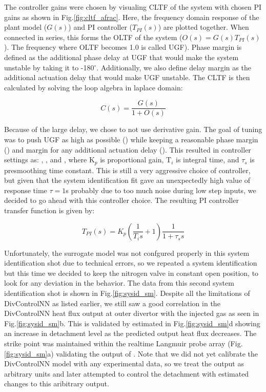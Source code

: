 The controller gains were chosen by visualing \ac{CLTF} of the system with chosen PI gains as shown in Fig.\ref{fig:cltf_afrac}.
Here, the frequency domain response of the plant model ($G(s)$) and PI controller ($T_{PI}(s)$) are plotted together.
When connected in series, this forms the \ac{OLTF} of the system ($O(s) = G(s) T_{PI}(s)$).
The frequency where \ac{OLTF} becomes 1.0 is called \ac{UGF}).
Phase margin is defined as the additional phase delay at \ac{UGF} that would make the system unstable by taking it to -180$^\circ$.
Additionally, we also define delay margin as the additional actuation delay that would make \ac{UGF} unstable.
The \ac{CLTF} is then calculated by solving the loop algebra in laplace domain:

\begin{equation}
    C(s) = \frac{G(s)}{1 + O(s)}
\label{eq:cltf}
\end{equation}

Because of the large delay, we chose to not use derivative gain.
The goal of tuning was to push \ac{UGF} as high as possible (\AfracUGF) while keeping a reasonable phase margin (\AfracPhaseMargin) and margin for any additional actuation delay (\AfracDelayMargin).
This resulted in controller settings as: \AfracKp, \AfracTi, and \Afracstau, where K$_p$ is proportional gain, T$_i$ is integral time, and $\tau_s$ is presmoothing time constant.
This is still a very aggressive choice of controller, but given that the system identification fit gave an unexpectedly high value of response time $\tau=1$s probably due to too much noise during low step inputs, we decided to go ahead with this controller choice.
The resulting PI controller transfer function is given by:

\begin{equation}
    T_{PI}(s) = K_p \left( \frac{1}{T_i s} + 1\right) \frac{1}{1 + \tau_s s}
\label{eq:PI}
\end{equation}

Unfortunately, the surrogate model was not confgured properly in this system identification shot due to technical errors, so we repeated a system identification but this time we decided to keep the nitrogen valve in constant open position, to look for any deviation in the behavior.
The data from this second system identification shot is shown in Fig.\ref{fig:sysid_sm}.
Despite all the limitations of DivControlNN as listed earlier, we still saw a good correlation in the DivControlNN heat flux output at outer divertor with the injected gas as seen in Fig.\ref{fig:sysid_sm}b.
This is validated by estimated \Afrac in Fig.\ref{fig:sysid_sm}d showing an increase in detachment level as the predicted output heat flux decreases.
The strike point was maintained within the realtime Langmuir probe array (Fig.\ref{fig:sysid_sm}a) validating the output of \Afrac.
Note that we did not yet calibrate the DivControlNN model with any experimental data, so we treat the output as arbitrary units and later attempted to control the detachment with estimated changes to this aribitrary output.


